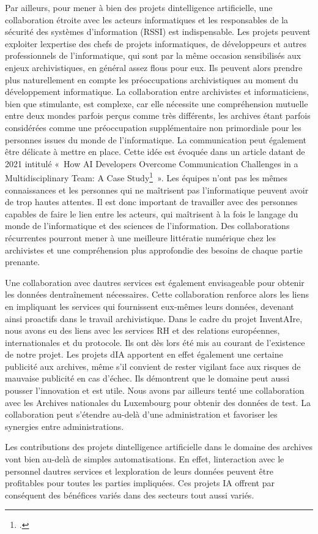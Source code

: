 Par ailleurs, pour mener à bien des projets
d\textquotesingle intelligence artificielle, une collaboration étroite
avec les acteurs informatiques et les responsables de la sécurité des
systèmes d'information (RSSI) est indispensable. Les projets peuvent exploiter
l\textquotesingle expertise des chefs de projets informatiques, de
développeurs et autres professionnels de l'informatique, qui sont par la même occasion
 sensibilisés aux enjeux archivistiques, en général assez flous
pour eux. Ils peuvent alors prendre plus naturellement en compte
les préoccupations archivistiques au moment du développement informatique.
La collaboration entre archivistes et informaticiens, bien que
stimulante, est complexe, car elle nécessite une compréhension mutuelle
entre deux mondes parfois perçus comme très différents, les archives
étant parfois considérées comme une préoccupation supplémentaire non
primordiale pour les personnes issues du monde de l'informatique. La
communication peut également être délicate à mettre en place. Cette idée
est évoquée dans un article datant de 2021 intitulé «~How AI Developers
Overcome Communication Challenges in a Multidisciplinary Team: A Case
Study\footcite{piorkowski_how_2021}~». Les
équipes n'ont pas les mêmes connaissances et les personnes qui ne
maîtrisent pas l'informatique peuvent avoir de trop hautes attentes. Il
est donc important de travailler avec des personnes capables de faire le
lien entre les acteurs, qui maîtrisent à la fois le langage du monde de
l'informatique et des sciences de l'information. Des collaborations
récurrentes pourront mener à une meilleure littératie numérique chez les
archivistes et une compréhension plus approfondie des besoins de chaque
partie prenante.

Une collaboration avec d\textquotesingle autres services est également
envisageable pour obtenir les données d\textquotesingle entraînement
nécessaires. Cette collaboration renforce alors les liens en impliquant
les services qui fournissent eux-mêmes leurs données, devenant ainsi
proactifs dans le travail archivistique. Dans le cadre du projet
InventAIre, nous avons eu des liens avec les services RH et des
relations européennes, internationales et du protocole. Ils ont dès
lors été mis au courant de l'existence de notre projet. Les projets
d\textquotesingle IA apportent en effet également une certaine publicité
aux archives, même s'il convient de rester vigilant face aux risques de
mauvaise publicité en cas d'échec. Ils démontrent que le domaine
peut aussi pousser l'innovation et est utile. Nous avons par ailleurs
tenté une collaboration avec les Archives nationales du Luxembourg pour
obtenir des données de test. La collaboration peut s'étendre au-delà
d'une administration et favoriser les synergies entre administrations.
\newline 

Les contributions des projets d\textquotesingle intelligence
artificielle dans le domaine des archives vont bien au-delà de simples
automatisations. En effet, l\textquotesingle interaction avec le
personnel d\textquotesingle autres services et
l\textquotesingle exploration de leurs données peuvent être profitables
pour toutes les parties impliquées. Ces projets IA offrent par
conséquent des bénéfices variés dans des secteurs tout aussi variés.